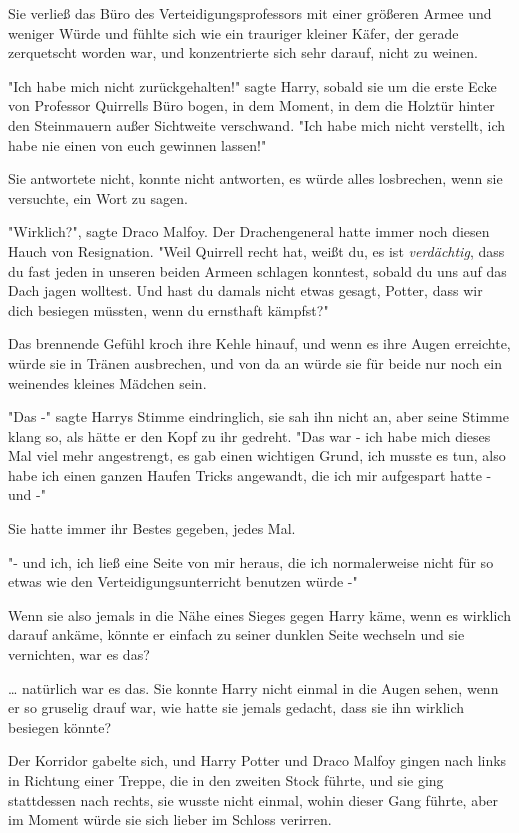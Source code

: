 {Sie verließ das Büro des Verteidigungsprofessors mit einer größeren Armee und weniger Würde und fühlte sich wie ein trauriger kleiner Käfer, der gerade zerquetscht worden war, und konzentrierte sich sehr darauf, nicht zu weinen.

"Ich habe mich nicht zurückgehalten!" sagte Harry, sobald sie um die erste Ecke von Professor Quirrells Büro bogen, in dem Moment, in dem die Holztür hinter den Steinmauern außer Sichtweite verschwand. "Ich habe mich nicht verstellt, ich habe nie einen von euch gewinnen lassen!"

Sie antwortete nicht, konnte nicht antworten, es würde alles losbrechen, wenn sie versuchte, ein Wort zu sagen.

"Wirklich?", sagte Draco Malfoy. Der Drachengeneral hatte immer noch diesen Hauch von Resignation. "Weil Quirrell recht hat, weißt du, es ist \emph{verdächtig}, dass du fast jeden in unseren beiden Armeen schlagen konntest, sobald du uns auf das Dach jagen wolltest. Und hast du damals nicht etwas gesagt, Potter, dass wir dich besiegen müssten, wenn du ernsthaft kämpfst?"

Das brennende Gefühl kroch ihre Kehle hinauf, und wenn es ihre Augen erreichte, würde sie in Tränen ausbrechen, und von da an würde sie für beide nur noch ein weinendes kleines Mädchen sein.

"Das -" sagte Harrys Stimme eindringlich, sie sah ihn nicht an, aber seine Stimme klang so, als hätte er den Kopf zu ihr gedreht. "Das war - ich habe mich dieses Mal viel mehr angestrengt, es gab einen wichtigen Grund, ich musste es tun, also habe ich einen ganzen Haufen Tricks angewandt, die ich mir aufgespart hatte - und -"

Sie hatte immer ihr Bestes gegeben, jedes Mal.

"- und ich, ich ließ eine Seite von mir heraus, die ich normalerweise nicht für so etwas wie den Verteidigungsunterricht benutzen würde -"

Wenn sie also jemals in die Nähe eines Sieges gegen Harry käme, wenn es wirklich darauf ankäme, könnte er einfach zu seiner dunklen Seite wechseln und sie vernichten, war es das?

… natürlich war es das. Sie konnte Harry nicht einmal in die Augen sehen, wenn er so gruselig drauf war, wie hatte sie jemals gedacht, dass sie ihn wirklich besiegen könnte?

Der Korridor gabelte sich, und Harry Potter und Draco Malfoy gingen nach links in Richtung einer Treppe, die in den zweiten Stock führte, und sie ging stattdessen nach rechts, sie wusste nicht einmal, wohin dieser Gang führte, aber im Moment würde sie sich lieber im Schloss verirren.

}
